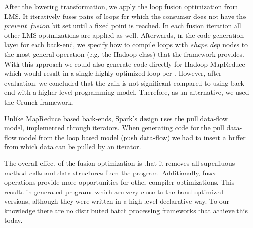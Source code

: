 After the lowering transformation, we apply the loop fusion optimization from
LMS. It iteratively fuses pairs of loops for which the consumer does not have
the $prevent\_fusion$ bit set until a fixed point is reached. In each fusion
iteration all other LMS optimizations are applied as well. Afterwards, in the
code generation layer for each back-end, we specify how to compile loops with
$shape\_dep$ nodes to the most general operation (e.g. the Hadoop 
class) that the framework provides. With this approach we could also generate
code directly for Hadoop MapReduce which would result in a single highly
optimized loop per . However, after evaluation, we concluded
that the gain is not significant compared to using back-end with a higher-level programming model. 
Therefore, as an alternative, we used the Crunch framework.

Unlike MapReduce based back-ends, Spark's design uses the pull data-flow model,
implemented through iterators. When generating code for the pull data-flow
model from the loop based model (push data-flow) we had to insert a buffer from which data
can be pulled by an iterator.

The overall effect of the fusion optimization is that it removes all superfluous
method calls and data structures from the program. Additionally, fused
operations provide more opportunities for other compiler optimizations.
This results in generated programs which are very close to the hand optimized
versions, although they were written in a high-level declarative way. To our
knowledge there are no distributed batch processing frameworks that achieve this
today.
